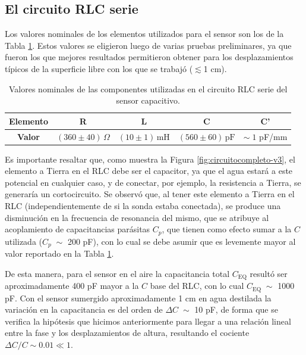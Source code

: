 \subsection{El circuito RLC serie} 
Los valores nominales de los elementos utilizados para el sensor son los de la Tabla \ref{tab:rlc_valores}. Estos valores se eligieron luego de varias pruebas preliminares, ya que fueron los que mejores resultados permitieron obtener para los desplazamientos típicos de la superficie libre con los que se trabajó ($\lesssim$1 cm).   %

\begin{table}[t!] %
	\centering
	\begin{tabular}{|c|c|c|c|c|}
		\hline
		\textbf{Elemento} & R & L & C & C' \\ \hline
		\textbf{Valor} & $(360 \pm 40)\,\Omega$ & $(10 \pm 1)\,\text{mH}$ & $(560 \pm 60)\,\text{pF}$ &  $\sim\;1$ pF/mm \\ \hline
		  
	\end{tabular}
	\caption{Valores nominales de las componentes utilizadas en el circuito RLC serie del sensor capacitivo. } %
	\label{tab:rlc_valores}
\end{table} 


Es importante resaltar que, como muestra la Figura \ref{fig:circuitocompleto-v3}, el elemento a Tierra en el RLC debe ser el capacitor, ya que el agua estará a este potencial en cualquier caso, y de conectar, por ejemplo, la resistencia a Tierra, se generaría un cortocircuito. Se observó que, al tener este elemento  a Tierra en el RLC (independientemente de si la sonda estaba conectada), se produce una disminución en la frecuencia de resonancia del mismo, que se atribuye al acoplamiento de capacitancias parásitas $C_p$, que tienen como efecto sumar a la $C$ utilizada ($C_p\;\sim$ 200 pF), con lo cual se debe asumir que es levemente mayor al valor reportado en la Tabla \ref{tab:rlc_valores}.  %


De esta manera, para el sensor en el aire la capacitancia total $C_{\text{EQ}}$ resultó ser aproximadamente 400 pF mayor a la $C$ base del RLC, con lo cual $C_{\text{EQ}}\;\sim$ 1000 pF. Con el sensor sumergido aproximadamente 1 cm en agua destilada la variación en la capacitancia es del orden de $\Delta C\;\sim$ 10 pF, de forma que se verifica la hipótesis que hicimos anteriormente para llegar a una relación lineal entre la fase y los desplazamientos de altura, resultando el cociente $\Delta C/C\sim0.01\ll1$.   %

